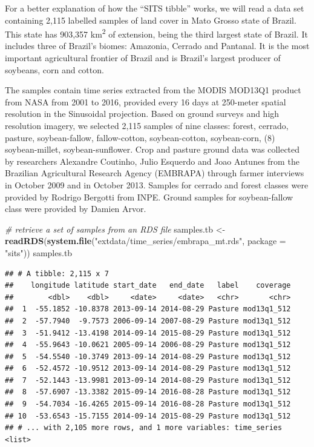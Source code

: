 \documentclass[11pt,]{article}
\newenvironment{Shaded}{\begin{snugshade}}{\end{snugshade}}
\newcommand{\KeywordTok}[1]{\textcolor[rgb]{0.13,0.29,0.53}{\textbf{#1}}}
\newcommand{\DataTypeTok}[1]{\textcolor[rgb]{0.13,0.29,0.53}{#1}}
\newcommand{\StringTok}[1]{\textcolor[rgb]{0.31,0.60,0.02}{#1}}
\newcommand{\CommentTok}[1]{\textcolor[rgb]{0.56,0.35,0.01}{\textit{#1}}}
\newcommand{\NormalTok}[1]{#1}
\begin{document}
For a better explanation of how the ``SITS tibble'' works, we will read
a data set containing 2,115 labelled samples of land cover in Mato
Grosso state of Brazil. This state has 903,357 km\textsuperscript{2} of
extension, being the third largest state of Brazil. It includes three of
Brazil's biomes: Amazonia, Cerrado and Pantanal. It is the most
important agricultural frontier of Brazil and is Brazil's largest
producer of soybeans, corn and cotton.

The samples contain time series extracted from the MODIS MOD13Q1 product
from NASA from 2001 to 2016, provided every 16 days at 250-meter spatial
resolution in the Sinusoidal projection. Based on ground surveys and
high resolution imagery, we selected 2,115 samples of nine classes:
forest, cerrado, pasture, soybean-fallow, fallow-cotton, soybean-cotton,
soybean-corn, (8) soybean-millet, soybean-sunflower. Crop and pasture
ground data was collected by researchers Alexandre Coutinho, Julio
Esquerdo and Joao Antunes from the Brazilian Agricultural Research
Agency (EMBRAPA) through farmer interviews in October 2009 and in
October 2013. Samples for cerrado and forest classes were provided by
Rodrigo Bergotti from INPE. Ground samples for soybean-fallow class were
provided by Damien Arvor\citep{Arvor2012}.

\begin{Shaded}
\begin{Highlighting}[]
\CommentTok{# retrieve a set of samples from an RDS file}
\NormalTok{samples.tb <-}\StringTok{ }\KeywordTok{readRDS}\NormalTok{(}\KeywordTok{system.file}\NormalTok{(}\StringTok{"extdata/time_series/embrapa_mt.rds"}\NormalTok{, }
                                     \DataTypeTok{package =} \StringTok{"sits"}\NormalTok{))}
\NormalTok{samples.tb}
\end{Highlighting}
\end{Shaded}

\begin{verbatim}
## # A tibble: 2,115 x 7
##    longitude latitude start_date   end_date   label    coverage
##        <dbl>    <dbl>     <date>     <date>   <chr>       <chr>
##  1  -55.1852 -10.8378 2013-09-14 2014-08-29 Pasture mod13q1_512
##  2  -57.7940  -9.7573 2006-09-14 2007-08-29 Pasture mod13q1_512
##  3  -51.9412 -13.4198 2014-09-14 2015-08-29 Pasture mod13q1_512
##  4  -55.9643 -10.0621 2005-09-14 2006-08-29 Pasture mod13q1_512
##  5  -54.5540 -10.3749 2013-09-14 2014-08-29 Pasture mod13q1_512
##  6  -52.4572 -10.9512 2013-09-14 2014-08-29 Pasture mod13q1_512
##  7  -52.1443 -13.9981 2013-09-14 2014-08-29 Pasture mod13q1_512
##  8  -57.6907 -13.3382 2015-09-14 2016-08-28 Pasture mod13q1_512
##  9  -54.7034 -16.4265 2015-09-14 2016-08-28 Pasture mod13q1_512
## 10  -53.6543 -15.7155 2014-09-14 2015-08-29 Pasture mod13q1_512
## # ... with 2,105 more rows, and 1 more variables: time_series <list>
\end{verbatim}
\end{document}
